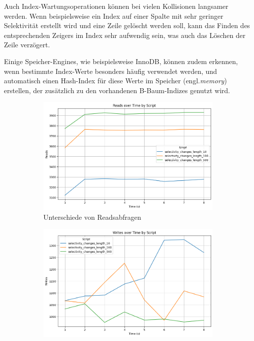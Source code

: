 Auch Index-Wartungsoperationen können bei vielen Kollisionen langsamer werden.
Wenn beispielsweise ein Index auf einer Spalte mit sehr geringer Selektivität erstellt wird und eine Zeile gelöscht werden soll, kann das Finden des entsprechenden Zeigers im Index sehr aufwendig sein, was auch das Löschen der Zeile verzögert.


Einige Speicher-Engines, wie beispielsweise InnoDB, können zudem erkennen, wenn bestimmte Index-Werte besonders häufig verwendet werden, und automatisch einen Hash-Index für diese Werte im Speicher (engl.\textit{memory}) erstellen, der zusätzlich zu den vorhandenen B-Baum-Indizes genutzt wird.


\begin{figure}[!ht]
    \centering
    \begin{subfigure}[t]{0.48\textwidth}
        \centering
        \includegraphics[width=\textwidth]{PNGs/Script/Index/Hash/selectivity-change/Reads}
        \caption[Hash - Kollisionen - Reads - Ergebnis]{Unterschiede von Readsabfragen}
        \label{hash-collision-reads}
    \end{subfigure}
    \hfill
    \begin{subfigure}[t]{0.48\textwidth}
        \centering
        \includegraphics[width=\textwidth]{PNGs/Script/Index/Hash/selectivity-change/Writes}

\end{subfigure}
\end{figure}
